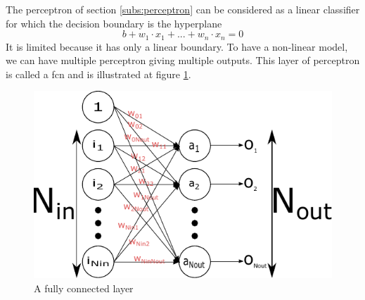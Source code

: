 The perceptron of section \ref{subs:perceptron} can be considered as a linear classifier for which the decision boundary is the hyperplane
$$ b + w_1 \cdot x_1 + ... + w_n \cdot x_n = 0$$
It is limited because it has only a linear boundary. To have a non-linear model, we can have multiple perceptron giving multiple outputs. This layer of perceptron is called a \acrfull{fcn} and is illustrated at figure \ref{fig:fcn}.
\begin{figure}[h]
    \centering
    \includegraphics[width=\textwidth]{Images/fcl.pdf}
    \caption{A fully connected layer}
    \label{fig:fcn}
\end{figure}
